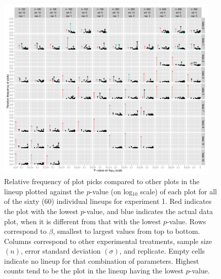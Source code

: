 \documentclass[12pt]{article}
\newcommand{\blue}[1]{{\color{blue} #1}} %
\begin{document}
\begin{figure}[hbtp]
   \centering
       \includegraphics[width=0.95\textwidth]{p_val_log_counts.pdf}
       \caption{Relative frequency of plot picks compared to other plots in the lineup plotted against the $p$-value (on log$_{10}$ scale) of each plot for all of the sixty (60) individual lineups for experiment 1. \blue{Red indicates the} plot with the lowest $p$-value, and \blue{blue indicates the} actual data plot, when it is different from that with the lowest $p$-value. Rows correspond to $\beta$, smallest to largest values from top to bottom. Columns correspond to other experimental treatments, sample size $(n)$, error standard deviation $(\sigma)$, and replicate. Empty cells indicate no lineup for that combination of parameters. Highest counts tend to be the plot in the lineup having the lowest $p$-value.}
       \label{fig:P-val_log}
\end{figure}
\end{document}
